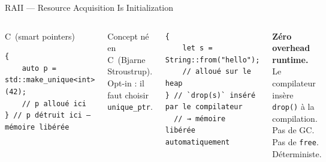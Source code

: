 \documentclass[aspectratio=169, 10pt]{beamer}
\newcommand{\CC}{C\nolinebreak\hspace{-.05em}\raisebox{.3ex}{\scriptsize\bfseries +}\nolinebreak\hspace{-.10em}\raisebox{.3ex}{\scriptsize\bfseries +}}
\newcommand{\rust}[1]{\texttt{#1}}
\newcommand{\ccode}[1]{\texttt{#1}}
\begin{document}
\begin{frame}[fragile]{RAII --- Resource Acquisition Is Initialization}
  \begin{columns}[t]
    \begin{block}{\CC\ (smart pointers)}
      \begin{verbatim}
{
    auto p = std::make_unique<int>(42);
    // p alloué ici
} // p détruit ici — mémoire libérée
      \end{verbatim}
    \end{block}
    Concept né en \CC\ (Bjarne Stroustrup).\\
    Opt-in : il faut choisir \texttt{unique_ptr}.

    \begin{tcolorbox}[safebox, title={\faRust\ Rust --- comportement \textbf{par défaut}}]
      \begin{verbatim}
{
    let s = String::from("hello");
    // alloué sur le heap
} // `drop(s)` inséré par le compilateur
  // → mémoire libérée automatiquement
      \end{verbatim}
    \end{tcolorbox}
    \begin{tcolorbox}[notebox]
      \small \textbf{Zéro overhead runtime.}\\
      Le compilateur insère \rust{drop()} à la compilation.\\
      Pas de GC. Pas de \ccode{free}. Déterministe.
    \end{tcolorbox}
  \end{columns}
\end{frame}
\end{document}
